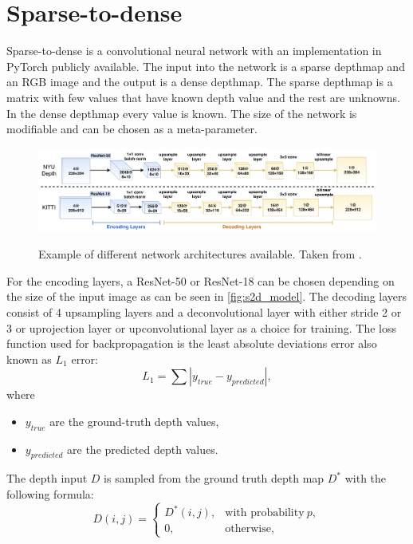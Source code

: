 \documentclass[twoside]{ctuthesis}
\theoremstyle{plain}
\theoremstyle{definition}
\theoremstyle{note}
\begin{document}
\section{Sparse-to-dense} \label{s2d}
Sparse-to-dense \cite{ma2018sparsetodense} is a convolutional neural network with an implementation in PyTorch publicly available. The input into the network is a sparse depthmap and an RGB image and the output is a dense depthmap.  The sparse depthmap is a matrix with few values that have known depth value and the rest are unknowns. In the dense depthmap every value is known. The size of the network is modifiable and can be chosen as a meta-parameter.
\begin{figure}
	\caption[Example of different network architectures available.]{Example of different network architectures available. Taken from \cite{ma2018sparsetodense}.}
	\includegraphics[width=\textwidth]{sparse2dense.png}
	\centering
	\label{fig:s2d_model}
\end{figure}
For the encoding layers, a ResNet-50 or ResNet-18 can be chosen depending on the size of the input image as can be seen in \autoref{fig:s2d_model}. The decoding layers consist of 4 upsampling layers and a deconvolutional layer with either stride 2 or 3 or uprojection layer or upconvolutional layer as a choice for training. The loss function used for backpropagation is the least absolute deviations error also known as $L_1$ error:
\begin{equation}
	L_1=\sum|y_{true}-y_{predicted}|,
\end{equation}
where
\begin{itemize}
	\item $y_{true}$ are the ground-truth depth values,
	\item $y_{predicted}$ are the predicted depth values.
\end{itemize}
The depth input $D$ is sampled from the ground truth depth map $D^*$ with the following formula:
\begin{equation}
	D(i,j)=\begin{cases}
		D^*(i,j),&\text{with probability}\ p,\\
		0,&\text{otherwise},
	\end{cases}
\end{equation}
\end{document}
